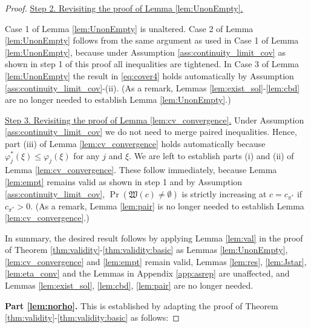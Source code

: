\documentclass[letterpaper,11pt]{article}
\theoremstyle{myplain}
\theoremstyle{mydefinition}
\theoremstyle{myremark}
\numberwithin{equation}{section}
\numberwithin{figure}{section}
\begin{document}
\begin{appendices}
\begin{proof}
	\noindent \underline{Step 2. Revisiting the proof of Lemma \ref{lem:UnonEmpty}.}
	
	Case 1 of Lemma \ref{lem:UnonEmpty} is unaltered. Case 2 of Lemma \ref{lem:UnonEmpty} follows from the same argument as used in Case 1 of Lemma \ref{lem:UnonEmpty}, because under Assumption \ref{ass:continuity_limit_cov} as shown in step 1 of this proof all inequalities are tightened. In Case 3 of Lemma \ref{lem:UnonEmpty} the result in \eqref{eq:cover4} holds automatically by Assumption \ref{ass:continuity_limit_cov}-(ii). (As a remark, Lemmas \ref{lem:exist_sol}-\ref{lem:cbd} are no longer needed to establish Lemma \ref{lem:UnonEmpty}.)\smallskip
	
	\noindent \underline{Step 3. Revisiting the proof of Lemma \ref{lem:cv_convergence}.}
	Under Assumption \ref{ass:continuity_limit_cov} we do not need to merge paired inequalities. Hence, part (iii) of Lemma \ref{lem:cv_convergence} holds automatically because $\varphi^*_j(\xi) \le \varphi_j(\xi)$ for any $j$ and $\xi$. We are left to establish parts (i) and (ii) of Lemma \ref{lem:cv_convergence}. These follow immediately, because Lemma \ref{lem:empt} remains valid as shown in step 1 and by Assumption \ref{ass:continuity_limit_cov}, $\Pr(\mathfrak{W}(c)\neq \emptyset)$ is strictly increasing at $c=c_{\pi^*}$ if $c_{\pi^*}>0$. (As a remark, Lemma \ref{lem:pair} is no longer needed to establish Lemma \ref{lem:cv_convergence}.)\smallskip 

In summary, the desired result follows by applying Lemma \ref{lem:val} in the proof of Theorem \ref{thm:validity}-\ref{thm:validity:basic} as Lemmas \ref{lem:UnonEmpty}, \ref{lem:cv_convergence} and \ref{lem:empt} remain valid,  Lemmas \ref{lem:res}, \ref{lem:Jstar}, \ref{lem:eta_conv} and the Lemmas in Appendix \ref{app:asrep} are unaffected, and Lemmas \ref{lem:exist_sol}, \ref{lem:cbd}, \ref{lem:pair} are no longer needed.

\textbf{Part \ref{lem:norho}.} This is established by adapting the proof of Theorem \ref{thm:validity}-\ref{thm:validity:basic} as follows:


\end{proof}
\end{appendices}
\end{document}
